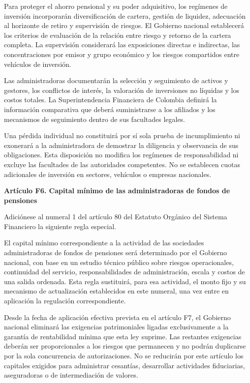 Para proteger el ahorro pensional y su poder adquisitivo, los regímenes de inversión incorporarán diversificación de cartera, gestión de liquidez, adecuación al horizonte de retiro y supervisión de riesgos. El Gobierno nacional establecerá los criterios de evaluación de la relación entre riesgo y retorno de la cartera completa. La supervisión considerará las exposiciones directas e indirectas, las concentraciones por emisor y grupo económico y los riesgos compartidos entre vehículos de inversión.

Las administradoras documentarán la selección y seguimiento de activos y gestores, los conflictos de interés, la valoración de inversiones no líquidas y los costos totales. La Superintendencia Financiera de Colombia definirá la información comparativa que deberá suministrarse a los afiliados y los mecanismos de seguimiento dentro de sus facultades legales.

Una pérdida individual no constituirá por sí sola prueba de incumplimiento ni exonerará a la administradora de demostrar la diligencia y observancia de sus obligaciones. Esta disposición no modifica los regímenes de responsabilidad ni excluye las facultades de las autoridades competentes. No se establecen cuotas adicionales de inversión en sectores, vehículos o empresas nacionales.

\textbf{Artículo F6. Capital mínimo de las administradoras de fondos de pensiones}\par\nobreak

Adiciónese al numeral 1 del artículo 80 del Estatuto Orgánico del Sistema Financiero la siguiente regla especial.

El capital mínimo correspondiente a la actividad de las sociedades administradoras de fondos de pensiones será determinado por el Gobierno nacional, con base en un estudio técnico público sobre riesgos operacionales, continuidad del servicio, responsabilidades de administración, escala y costos de una salida ordenada. Esta regla sustituirá, para esa actividad, el monto fijo y su mecanismo de actualización establecidos en este numeral, una vez entre en aplicación la regulación correspondiente.

Desde la fecha de aplicación efectiva prevista en el artículo F7, el Gobierno nacional eliminará las exigencias patrimoniales ligadas exclusivamente a la garantía de rentabilidad mínima que esta ley suprime. Las restantes exigencias deberán ser proporcionales a los riesgos que permanecen y no podrán duplicarse por la sola concurrencia de autorizaciones. No se reducirán por este artículo los capitales exigidos para administrar cesantías, desarrollar actividades fiduciarias, aseguradoras o de intermediación de valores.


